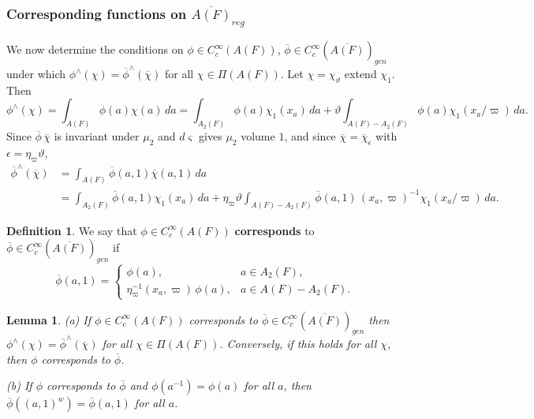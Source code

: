 \documentclass[12pt,letterpaper]{book}
\theoremstyle{plain}
\newtheorem{lemma}[theorem]{Lemma}
\theoremstyle{definition}
\newtheorem{definition}[theorem]{Definition}
\theoremstyle{remark}
\theoremstyle{remark}
\begin{document}
\subsubsection{Corresponding functions on \texorpdfstring{$\overline{A(F)}_{reg}$}{A(F)-bar_reg}}

We now determine the conditions on
$\phi \in C_c^\infty(A(F))$,
$\overline{\phi}
\in C_c^\infty(\overline{A(F)})_{gen}$
under which
$\phi^{\wedge}(\chi)=
\overline{\phi}^{\wedge}(\overline{\chi})$ for all $\chi \in \Pi(A(F))$.
Let $\chi=\chi_\vartheta$ extend $\chi_1$. Then
\begin{equation}\label{eq:FT-lin}
\phi^{\wedge}(\chi)=
\int_{A(F)}\phi(a)\chi(a)\, da
=\int_{A_2(F)}\phi(a)\chi_1(x_a)\, da +
\vartheta \int_{A(F)-A_2(F)}\phi(a)\chi_1(x_a/\varpi)\, da .
\end{equation}
Since $\overline{\phi}\,\overline{\chi}$ is invariant under
$\mu_2$ and $d\varsigma$ gives $\mu_2$ volume $1$, and since
$\overline{\chi}=\overline{\chi}_{\epsilon}$ with
$\epsilon=\eta_\varpi\vartheta$,
\begin{equation}\label{eq:FT-gen}
\begin{aligned}
\overline{\phi}^{\wedge}(\overline{\chi})&=
\int_{A(F)}\overline{\phi}(a,1)\overline{\chi}(a,1)\, da\\
&=\int_{A_2(F)}\overline{\phi}(a,1)\chi_1(x_a)\, da +
\eta_\varpi\vartheta \int_{A(F)-A_2(F)}\overline{\phi}(a,1)\,(x_a,\varpi)^{-1}
\chi_1(x_a/\varpi)\, da.
\end{aligned}
\end{equation}

\begin{definition}\label{def:corrA} We say that
$\phi \in C_c^\infty(A(F))$ {\bf corresponds} to
$\overline{\phi}
\in C_c^\infty(\overline{A(F)})_{gen}$
if
\[
\overline{\phi}(a,1)=
\left\{
\begin{array}{ll}
\phi(a), & a\in A_2(F),\\
\eta_\varpi^{-1}(x_a,\varpi)\,\phi(a), & a\in A(F)-A_2(F).
\end{array}
\right.
\]
\end{definition}

\begin{lemma}\label{lem:FT-match}
(a) If $\phi \in C_c^\infty(A(F))$ corresponds to
$\overline{\phi}\in C_c^\infty(\overline{A(F)})_{gen}$
then
$\phi^{\wedge}(\chi)=
\overline{\phi}^{\wedge}(\overline{\chi})$
for all $\chi \in \Pi(A(F))$. Conversely, if this holds for all $\chi$,
then $\phi$ corresponds to $\overline{\phi}$.

(b) If $\phi$ corresponds to $\overline{\phi}$ and $\phi(a^{-1})=\phi(a)$
for all $a$, then $\overline{\phi}((a,1)^w)=\overline{\phi}(a,1)$ for all
$a$.
\end{lemma}
\end{document}
